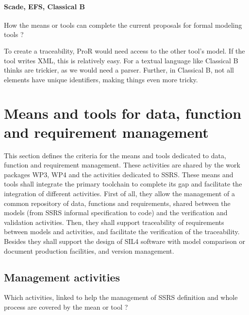 \paragraph{Scade, EFS, Classical B}
How the means or tools can complete the current proposals for formal modeling tools ?

\begin{author_comment}
To create a traceability, ProR would need access to the other tool's model.  If the tool writes XML, this is relatively easy.  For a textual language like Classical B thinks are trickier, as we would need a parser.  Further, in Classical B, not all elements have unique identifiers, making things even more tricky.
\end{author_comment}


\section{Means and tools for data, function and requirement management}
\label{sec:management}


This section defines the criteria for the means and tools dedicated to data, function and requirement management. These activities are shared by the work packages WP3, WP4 and the activities dedicated to  SSRS.
These means and tools shall integrate the primary toolchain to  complete its gap and facilitate the integration of different activities. First of all, they  allow the management of a common repository of data, functions and requirements, shared between the models (from SSRS informal specification to code) and the verification and validation activities.
Then, they shall support traceability of requirements between models and activities, and facilitate the verification of the traceability.
Besides they shall support the design of SIL4 software with model comparison or document production facilities, and version management.

\subsection{Management activities}

Which activities, linked to help the management of SSRS definition and whole process are covered by the mean or tool  ?

